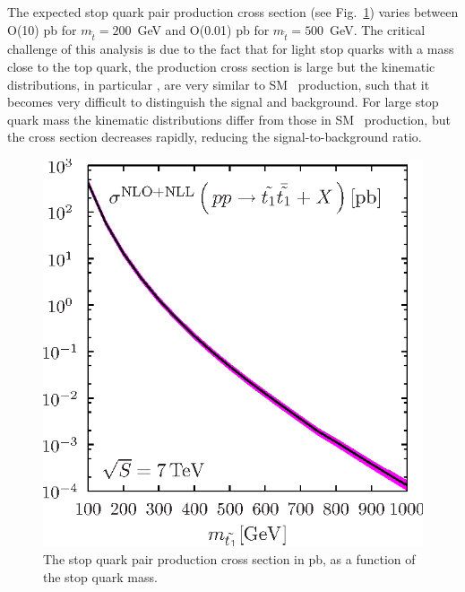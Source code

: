 The expected stop quark pair production cross section (see Fig.~\ref{fig:stopxsec}) varies between O(10) pb
for $m_{\tilde{t}}=200$~GeV and O(0.01) pb for $m_{\tilde{t}}=500$~GeV. The critical challenge of this analysis
is due to the fact that for light stop quarks with a mass close to the top quark, the production cross section is
large but the kinematic distributions, in particular \mt, are very similar to SM \ttbar\ production, such that it becomes very
difficult to distinguish the signal and background. For large stop quark mass the kinematic distributions differ
from those in SM \ttbar\ production, but the cross section decreases rapidly, reducing the signal-to-background
ratio.

\begin{figure}[hbt]
  \begin{center}
	\includegraphics[width=0.5\linewidth]{plots/total_scale_pdf_LHC.eps}
	\caption{
	  \label{fig:stopxsec}\protect 
          The stop quark pair production cross section in pb, as a function of the stop quark mass.}
  \end{center}
\end{figure}


